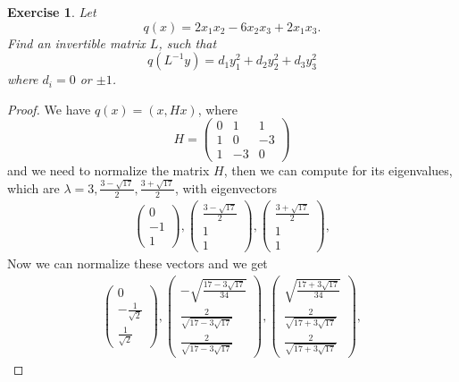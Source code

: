 \documentclass[11pt]{book}
\newtheorem{exercise}{Exercise}[section]
\theoremstyle{definition}
\numberwithin{equation}{subsection}
\begin{document}
\begin{exercise}
Let%
$$
q\left(  x\right)  =2x_{1}x_{2}-6x_{2}x_{3}+2x_{1}x_{3}.
$$
Find an invertible matrix $L$, such that%
$$
q\left(  L^{-1}y\right)  =d_{1}y_{1}^{2}+d_{2}y_{2}^{2}+d_{3}y_{3}^{2}%
$$
where $d_{i}=0$ or $\pm1$.
\end{exercise}
\begin{proof}
We have $q(x) = (x,Hx)$, where 
$$
H = \left(
\begin{matrix}
0 & 1 & 1\\
1 & 0 & -3\\
1 & -3 & 0
\end{matrix}
\right)
$$
and we need to normalize the matrix $H$, then we can compute for its eigenvalues, which are $\lambda = 3, \frac{3-\sqrt{17}}{2}, \frac{3+\sqrt{17}}{2}$, with eigenvectors 
\begin{align*}
    \left(\begin{matrix} 0 \\ - 1\\ 1 
    \end{matrix}\right), 
    \left(\begin{matrix} \frac{3-\sqrt{17}}{2} \\ 1\\ 1 
    \end{matrix}\right), 
    \left(\begin{matrix} \frac{3+\sqrt{17}}{2} \\ 1\\ 1 
    \end{matrix}\right), 
\end{align*}
Now we can normalize these vectors and we get 
\begin{align*}
    \left(\begin{matrix} 0 \\ - \frac{1}{\sqrt{2}}\\ \frac{1}{\sqrt{2}} 
    \end{matrix}\right), 
    \left(\begin{matrix} -\sqrt{\frac{17-3\sqrt{17}}{34}} \\ \frac{2}{\sqrt{17-3\sqrt{17}}}\\ \frac{2}{\sqrt{17-3\sqrt{17}}} 
    \end{matrix}\right), 
    \left(\begin{matrix} \sqrt{\frac{17+3\sqrt{17}}{34}} \\ \frac{2}{\sqrt{17+3\sqrt{17}}} \\ \frac{2}{\sqrt{17+3\sqrt{17}}} 
    \end{matrix}\right), 

\end{align*}
\end{proof}
\end{document}
